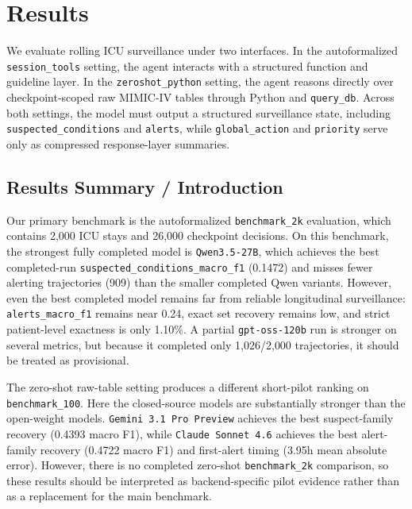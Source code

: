
\section{Results}

We evaluate rolling ICU surveillance under two interfaces. In the autoformalized \texttt{session\_tools} setting, the agent interacts with a structured function and guideline layer. In the \texttt{zeroshot\_python} setting, the agent reasons directly over checkpoint-scoped raw MIMIC-IV tables through Python and \texttt{query\_db}. Across both settings, the model must output a structured surveillance state, including \texttt{suspected\_conditions} and \texttt{alerts}, while \texttt{global\_action} and \texttt{priority} serve only as compressed response-layer summaries.

\subsection{Results Summary / Introduction}

Our primary benchmark is the autoformalized \texttt{benchmark\_2k} evaluation, which contains 2{,}000 ICU stays and 26{,}000 checkpoint decisions. On this benchmark, the strongest fully completed model is \texttt{Qwen3.5-27B}, which achieves the best completed-run \texttt{suspected\_conditions\_macro\_f1} (0.1472) and misses fewer alerting trajectories (909) than the smaller completed Qwen variants. However, even the best completed model remains far from reliable longitudinal surveillance: \texttt{alerts\_macro\_f1} remains near 0.24, exact set recovery remains low, and strict patient-level exactness is only 1.10\%. A partial \texttt{gpt-oss-120b} run is stronger on several metrics, but because it completed only 1{,}026/2{,}000 trajectories, it should be treated as provisional.

The zero-shot raw-table setting produces a different short-pilot ranking on \texttt{benchmark\_100}. Here the closed-source models are substantially stronger than the open-weight models. \texttt{Gemini 3.1 Pro Preview} achieves the best suspect-family recovery (0.4393 macro F1), while \texttt{Claude Sonnet 4.6} achieves the best alert-family recovery (0.4722 macro F1) and first-alert timing (3.95h mean absolute error). However, there is no completed zero-shot \texttt{benchmark\_2k} comparison, so these results should be interpreted as backend-specific pilot evidence rather than as a replacement for the main benchmark.

